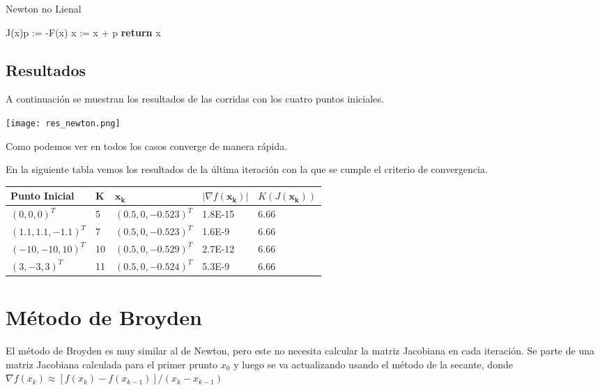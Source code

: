 \documentclass{article}
\begin{document}
\begin{multicols}{2}
\begin{algorithm}[H]
\caption{Newton no Lienal}\label{newton}
\begin{algorithmic}[1]
    \State J(x)p := -F(x)
    \State x := x + p
  \EndWhile
  \State\textbf{return} x
\EndFunction
\end{algorithmic}
\end{algorithm}

\subsection{Resultados}

A continuación se muestran los resultados de las corridas con los cuatro puntos iniciales.

\texttt{[image: res\_newton.png]}

Como podemos ver en todos los casos converge de manera rápida.

En la siguiente tabla vemos los resultados de la última iteración con la que se cumple el criterio de convergencia.

\begin{table}[H]
\footnotesize
\centering
\label{my-label}
\begin{tabular}{|l|l|l|l|l|}
\hline
Punto Inicial      & K & $\boldsymbol{x_k}$    & $|\nabla f(\boldsymbol{x_k})|$ & $K(J(\boldsymbol{x_k}))$ \\ \hline
$(0,0,0)^T$        & 5 &  $(0.5,0, -0.523)^T$ & 1.8E-15        &   6.66                     \\ \hline
$(1.1,1.1,-1.1)^T$ & 7 &  $(0.5,0, -0.523)^T$ & 1.6E-9        &    6.66                  \\ \hline
$(-10, -10 , 10)^T$& 10&  $(0.5,0, -0.529)^T$ & 2.7E-12        &   6.66                  \\ \hline
$(3, -3 , 3)^T$    & 11&  $(0.5,0, -0.524)^T$ & 5.3E-9       &     6.66                 \\ \hline
\end{tabular}
\end{table}


\section{Método de Broyden}

El método de Broyden es muy similar al de Newton, pero este no necesita calcular la matriz Jacobiana en cada iteración. Se parte de una matriz Jacobiana calculada para el primer prunto $x_0$ y luego se va actualizando usando el método de la secante, donde $\nabla f(x_k) \approx [f(x_k) - f(x_{k-1})]/ (x_k - x_{k-1})$


\end{multicols}
\end{document}

